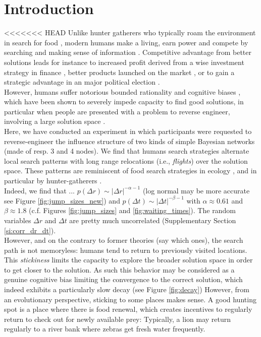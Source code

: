 \section{Introduction}
<<<<<<< HEAD
Unlike hunter gatherers who typically  roam the environment in search for food \cite{}, modern humans make a living, earn power and compete by searching and making sense of information \cite{}. Competitive advantage from better solutions leads for instance to increased profit derived from a wise investment strategy in finance \cite{}, better products launched on the market \cite{}, or to gain a strategic advantage in an major political election \cite{obama_ict}. \\

However, humans suffer notorious bounded rationality \cite{simon} and cognitive biases \cite{}, which have been shown to severely impede capacity to find good solutions, in particular when people are presented with a problem  to reverse engineer, involving a large solution space \cite{}.\\

Here, we have conducted an experiment in which participants were requested to reverse-engineer the influence structure of two kinds of simple Bayesian networks (made of resp. 3 and 4 nodes). We find that humans search strategies alternate local search patterns with long range relocations (i.e., {\it flights}) over the solution space. These patterns are reminiscent of food search strategies in ecology \cite{}, and in particular by hunter-gatherers \cite{}.\\ 

Indeed, we find that ...  $p(\Delta r) \sim |\Delta r | ^{-\alpha -1}$ (log normal may be more accurate see Figure \ref{fig:jump_sizes_new}) and $p(\Delta t) \sim  |\Delta t | ^{-\beta -1}$ with $\alpha \approx 0.61$ and $\beta \approx 1.8$ (c.f. Figures \ref{fig:jump_sizes} and \ref{fig:waiting_times}). The random variables $\Delta r$ and $\Delta t$ are pretty much uncorrelated (Supplementary Section \ref{si:corr_dr_dt}).\\

However, and on the contrary to former theories (say which ones), the search path is not memoryless: humans tend to return to previously visited locations. This {\it stickiness} limits the capacity to explore the broader solution space in order to get closer to the solution. As such this behavior may be considered as a genuine cognitive bias limiting the convergence to the correct solution, which indeed exhibits a particularly slow decay (see Figure \ref{fig:decay})  However, from an evolutionary perspective, sticking to some places makes sense. A good hunting spot is a place where there is food renewal, which creates incentives to regularly return to check out for newly available prey: Typically, a lion may return regularly to a river bank where zebras get fresh water frequently. \\

